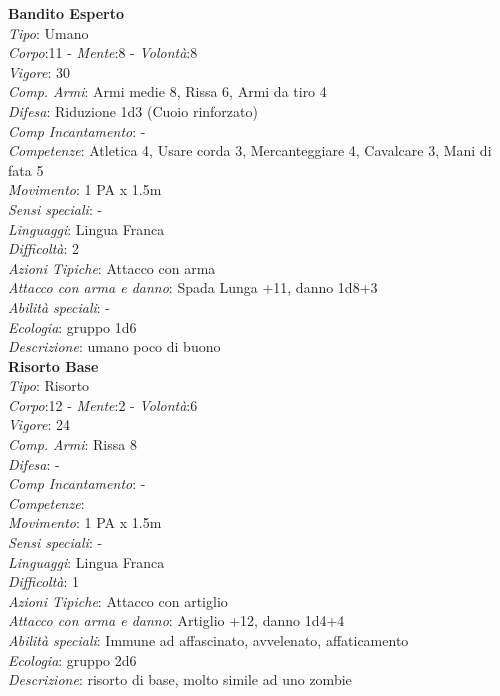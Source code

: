 \documentclass[12pt,a4paper,twoside,openany]{book}
\begin{document}
\begin{multicols}{2}


\textbf{Bandito Esperto}\\
\textit{Tipo}: Umano\\
\textit{Corpo}:11 - \textit{Mente}:8 - \textit{Volontà}:8\\
\textit{Vigore}:  30 \\ %
\textit{Comp. Armi}: Armi medie 8, Rissa 6, Armi da tiro 4\\
\textit{Difesa}: Riduzione 1d3 (Cuoio rinforzato)\\
\textit{Comp Incantamento}: -\\
\textit{Competenze}: Atletica 4, Usare corda 3, Mercanteggiare 4, Cavalcare 3, Mani di fata 5\\
\textit{Movimento}: 1 PA x 1.5m\\
\textit{Sensi speciali}: -\\
\textit{Linguaggi}: Lingua Franca\\
\textit{Difficoltà}: 2\\
\textit{Azioni Tipiche}: Attacco con arma\\
\textit{Attacco con arma e danno}: Spada Lunga +11, danno 1d8+3\\
\textit{Abilità speciali}: -\\
\textit{Ecologia}: gruppo 1d6\\
\textit{Descrizione}: umano poco di buono\\

\textbf{Risorto Base}\\
\textit{Tipo}: Risorto\\
\textit{Corpo}:12 - \textit{Mente}:2 - \textit{Volontà}:6\\
\textit{Vigore}:  24 \\ %
\textit{Comp. Armi}: Rissa 8\\
\textit{Difesa}: -\\
\textit{Comp Incantamento}: -\\
\textit{Competenze}: \\
\textit{Movimento}: 1 PA x 1.5m\\
\textit{Sensi speciali}: -\\
\textit{Linguaggi}: Lingua Franca\\
\textit{Difficoltà}: 1\\
\textit{Azioni Tipiche}: Attacco con artiglio\\
\textit{Attacco con arma e danno}: Artiglio +12, danno 1d4+4\\
\textit{Abilità speciali}: Immune ad affascinato, avvelenato, affaticamento	\\
\textit{Ecologia}: gruppo 2d6\\
\textit{Descrizione}: risorto di base, molto simile ad uno zombie\\

\end{multicols}
\end{document}

